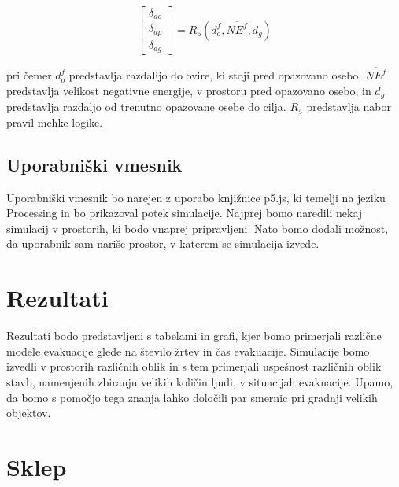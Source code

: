 \documentclass[9pt]{pnas-new}
\begin{document}
\begin{equation}
\label{delta_equation}
\begin{bmatrix}
\delta_{ao}\\
\delta_{ap}\\
\delta_{ag}
\end{bmatrix} = R_{5} (d_{o}^f, \overline{NE^f}, d_{g})
\end{equation}

pri čemer ${d_{o}^f}$ predstavlja razdalijo do ovire, ki stoji pred opazovano osebo, ${\overline{NE^f}}$ predstavlja velikost negativne energije, v prostoru pred opazovano osebo, in ${d_{g}}$ predstavlja razdaljo od trenutno opazovane osebe do cilja. ${R_{5}}$ predstavlja nabor pravil mehke logike. 

\subsection*{Uporabniški vmesnik}
Uporabniški vmesnik bo narejen z uporabo knjižnice p5.js, ki temelji na jeziku Processing in bo prikazoval potek simulacije. Najprej bomo naredili nekaj simulacij v prostorih, ki bodo vnaprej pripravljeni. Nato bomo dodali možnost, da uporabnik sam nariše prostor, v katerem se simulacija izvede.

\section*{Rezultati}
Rezultati bodo predstavljeni s tabelami in grafi, kjer bomo primerjali različne modele evakuacije glede na število žrtev in čas evakuacije. Simulacije bomo izvedli v prostorih različnih oblik in s tem primerjali uspešnost različnih oblik stavb, namenjenih zbiranju velikih količin ljudi, v situacijah evakuacije. Upamo, da bomo s pomočjo tega znanja lahko določili par smernic pri gradnji velikih objektov.

\section*{Sklep}

\showacknow %


\begin{multicols}{2}
\section*{\bibname}

\end{multicols}
\end{document}

